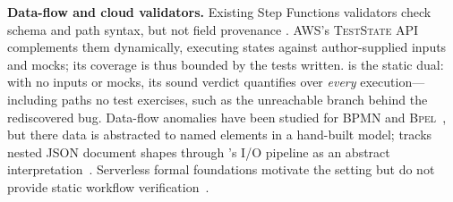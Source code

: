 \textbf{Data-flow and cloud validators.} Existing Step Functions validators check schema and path
syntax, but not field provenance
\cite{awsStatelint,aslValidator,awsValidateDefinition,awsStepFunctions}. 
AWS's \textsc{TestState} API~\cite{awsTestState} complements them
dynamically, executing states against author-supplied inputs and mocks;
its coverage is thus bounded by the tests written. \tool{} is the static
dual: with no inputs or mocks, its sound verdict quantifies over
\emph{every} execution---including paths no test exercises, such as the
unreachable branch behind the rediscovered  bug.
Data-flow anomalies have
been studied for BPMN and \textsc{Bpel}~\cite{sun2006dataflow,trcka2009antipatterns}, but there
data is abstracted to named elements in a hand-built model; \tool{} tracks nested JSON document
shapes through \asl{}'s I/O pipeline as an abstract interpretation~\cite{cousot1977}. Serverless
formal foundations motivate the setting but do not provide static workflow
verification~\cite{jangda2019serverless}.

